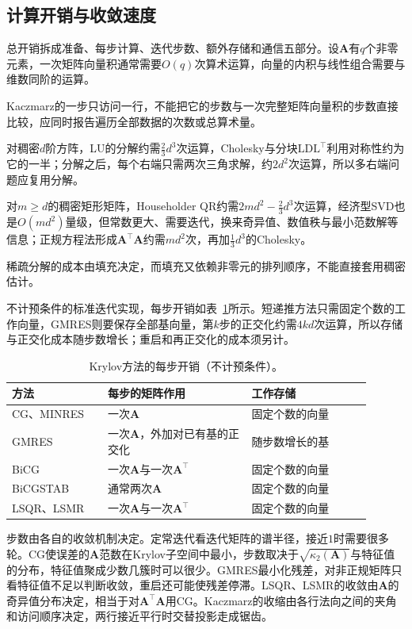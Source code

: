\subsection{计算开销与收敛速度}
\label{sec:ls-method-selection-cost}

总开销拆成准备、每步计算、迭代步数、额外存储和通信五部分。设$\bm A$有$q$个非零元素，一次矩阵向量积通常需要$O(q)$次算术运算，向量的内积与线性组合需要与维数同阶的运算。

Kaczmarz的一步只访问一行，不能把它的步数与一次完整矩阵向量积的步数直接比较，应同时报告遍历全部数据的次数或总算术量。

对稠密$d$阶方阵，LU的分解约需$\tfrac23d^3$次运算，Cholesky与分块$\mathrm{LDL}^\top$利用对称性约为它的一半；分解之后，每个右端只需两次三角求解，约$2d^2$次运算，所以多右端问题应复用分解。

对$m\geq d$的稠密矩形矩阵，Householder QR约需$2md^2-\tfrac23d^3$次运算，经济型SVD也是$O(md^2)$量级，但常数更大、需要迭代，换来奇异值、数值秩与最小范数解等信息；正规方程法形成$\bm A^\top\bm A$约需$md^2$次，再加$\tfrac13d^3$的Cholesky。

稀疏分解的成本由填充决定，而填充又依赖非零元的排列顺序，不能直接套用稠密估计。

不计预条件的标准迭代实现，每步开销如表~\ref{tab:ls-iterative-cost}所示。短递推方法只需固定个数的工作向量，GMRES则要保存全部基向量，第$k$步的正交化约需$4kd$次运算，所以存储与正交化成本随步数增长；重启和再正交化的成本须另计。

\begin{table}[htbp]
\centering
\small
\begin{tabular}{@{}p{0.24\linewidth}p{0.36\linewidth}p{0.3\linewidth}@{}}
\toprule
方法 & 每步的矩阵作用 & 工作存储\\
\midrule
CG、MINRES & 一次$\bm A$ & 固定个数的向量\\
GMRES & 一次$\bm A$，外加对已有基的正交化 & 随步数增长的基\\
BiCG & 一次$\bm A$与一次$\bm A^\top$ & 固定个数的向量\\
BiCGSTAB & 通常两次$\bm A$ & 固定个数的向量\\
LSQR、LSMR & 一次$\bm A$与一次$\bm A^\top$ & 固定个数的向量\\
\bottomrule
\end{tabular}
\caption{Krylov方法的每步开销（不计预条件）。}
\label{tab:ls-iterative-cost}
\end{table}

步数由各自的收敛机制决定。定常迭代看迭代矩阵的谱半径，接近$1$时需要很多轮。CG使误差的$\bm A$范数在Krylov子空间中最小，步数取决于$\sqrt{\kappa_2(\bm A)}$与特征值的分布，特征值聚成少数几簇时可以很少。GMRES最小化残差，对非正规矩阵只看特征值不足以判断收敛，重启还可能使残差停滞。LSQR、LSMR的收敛由$\bm A$的奇异值分布决定，相当于对$\bm A^\top\bm A$用CG。Kaczmarz的收缩由各行法向之间的夹角和访问顺序决定，两行接近平行时交替投影走成锯齿。

